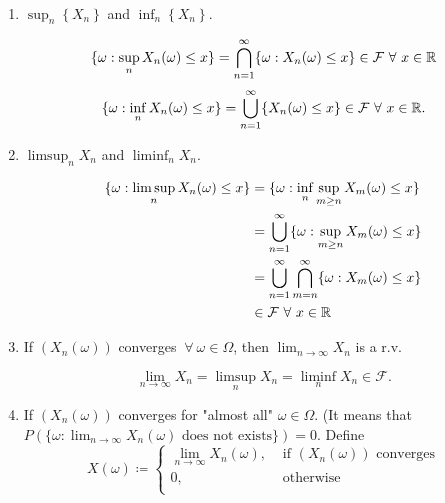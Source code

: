 \documentclass[class=article,crop=false]{standalone}
\begin{document}
\begin{eg}
~\begin{enumerate}[label=\arabic*)]
	\item $ \sup_n\left\{X_n\right\} $ and $ \inf_n\left\{ X_n \right\} $.
		\begin{prf}
			\[
				\{\omega: \sup_n X_n(\omega) \leq x\} = \bigcap_{ n=1}^{ \infty} \{\omega: X_n(\omega) \leq x\} \in \mathcal{F} \ \forall \ x \in \mathbb{R}
			\]
			\[
				\{\omega: \inf_n X_n(\omega) \leq x \} = \bigcup_{ n =1}^{\infty} \{ X_n(\omega) \leq x \} \in \mathcal{F} \ \forall \ x \in \mathbb{R} 
			.\] 
		\end{prf}
	\item $ \limsup_{  n} X_n$ and $ \liminf_{  n} X_n$.
		\begin{prf}
		\begin{align*}
		\{\omega: \limsup_{  n} X_n(\omega) \leq x\} &= \{\omega: \inf_n \sup_{m\geq n} X_m(\omega)\leq x\}\\ 
		&= \bigcup_{ n =1}^{\infty} \{\omega: \sup_{m\geq n} X_m(\omega)\leq x\}\\
		&= \bigcup_{ n =1}^{\infty} \bigcap_{ m=n}^{ \infty} \{\omega: X_m(\omega) \leq x\}   \\
		& \in \mathcal{F} \ \forall \ x \in \mathbb{R} 
		\end{align*}
		\end{prf}
	\item If $(X_n(\omega)) $ converges $ \ \forall \ \omega \in \Omega$, then $ \lim_{ n \to \infty} X_n$ is a r.v.
		\begin{prf}
		\[
		\lim_{ n \to \infty} X_n = \limsup_{  n} X_n=\liminf_{  n} X_n \in \mathcal{F}
		.\] 
		\end{prf}
	\item If $ (X_n(\omega))$ converges for "almost all" $ \omega \in \Omega$. (It means that $ P(\{\omega: \lim_{ n \to \infty} X_n(\omega) \text{ does not exists} \} ) =0$. Define
\begin{equation*}
	X(\omega) \coloneqq
\begin{cases}
	\lim_{ n \to \infty} X_n(\omega) , & \text{ if }  (X_n(\omega)) \text{ converges}\\
	0, & \text{ otherwise} \\
\end{cases}
\end{equation*}
\end{enumerate}

\end{eg}
\end{document}
